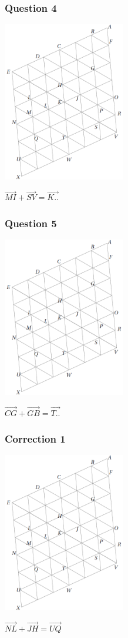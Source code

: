 \documentclass[15pt, mathserif]{beamer}
\begin{document}
\begin{frame} 
	\frametitle{Question 4}
\begin{center} 
 \includegraphics[width=0.4\textwidth]{GrilleIso2} \end{center}$\overrightarrow{MI}+\overrightarrow{SV}=\overrightarrow{K..}$  \end{frame}


\begin{frame} 
	\frametitle{Question 5}
\begin{center} 
 \includegraphics[width=0.4\textwidth]{GrilleIso2} \end{center}$\overrightarrow{CG}+\overrightarrow{GB}=\overrightarrow{T..}$  \end{frame}


\begin{frame}
\vspace{-10mm}
	\frametitle{Correction 1}
\begin{center} 
 \includegraphics[width=0.4\textwidth]{GrilleIso2} \end{center}$\overrightarrow{NL}+\overrightarrow{JH}=\overrightarrow{UQ}$\end{frame}
\end{document}
